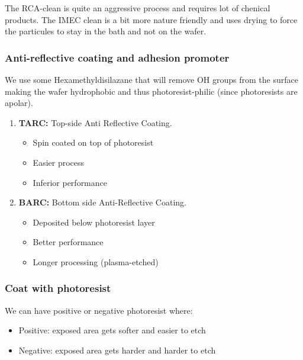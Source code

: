 \documentclass[
]{article}
\begin{document}
The RCA-clean is quite an aggressive process and requires lot of
chenical products. The IMEC clean is a bit more nature friendly and uses
drying to force the particules to stay in the bath and not on the wafer.

\hypertarget{anti-reflective-coating-and-adhesion-promoter}{%
\subsubsection{Anti-reflective coating and adhesion
promoter}\label{anti-reflective-coating-and-adhesion-promoter}}

We use some Hexamethyldisilazane that will remove OH groups from the
surface making the wafer hydrophobic and thus photoresist-philic (since
photoresists are apolar).

\begin{enumerate}
\def\labelenumi{\arabic{enumi}.}
\item
  \textbf{TARC:} Top-side Anti Reflective Coating.

  \begin{itemize}
  \item
    Spin coated on top of photoresist
  \item
    Easier process
  \item
    Inferior performance
  \end{itemize}
\item
  \textbf{BARC:} Bottom side Anti-Reflective Coating.

  \begin{itemize}
  \item
    Deposited below photoresist layer
  \item
    Better performance
  \item
    Longer processing (plasma-etched)
  \end{itemize}
\end{enumerate}

\hypertarget{coat-with-photoresist}{%
\subsubsection{Coat with photoresist}\label{coat-with-photoresist}}

We can have positive or negative photoresist where:

\begin{itemize}
\item
  Positive: exposed area gets softer and easier to etch
\item
  Negative: exposed area gets harder and harder to etch
\end{itemize}
\end{document}

